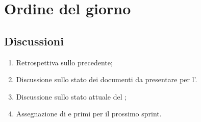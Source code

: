\section{Ordine del giorno} \label{sec:agenda}
\subsection{Discussioni} \label{subsec:discussione}
\begin{enumerate}
    \item Retrospettiva sullo  precedente;
    \item Discussione sullo stato dei documenti da presentare per l’.
    \item Discussione sullo stato attuale del ;
    \item Assegnazione di  e primi  per il prossimo sprint.
\end{enumerate}
